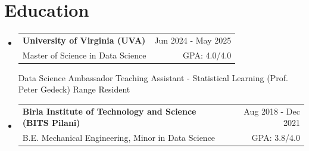 \documentclass[letterpaper,11pt]{article}
\makeatletter
\newcommand{\resumeeduSubheading}[4]{
  \item
    \begin{tabular*}{1\textwidth}{l@{\extracolsep{\fill}}r}
      \textbf{\large{#1}} & {\small{#4}} \\
      {{\small{#3}}} & {{\small{#2}}}
    \end{tabular*}
  \vspace{-0.4cm}
}
\newcommand{\resumeSubHeadingListStart}{\begin{itemize}[leftmargin=0.0in, label={}]}
\newcommand{\resumeSubHeadingListEnd}{\end{itemize}}
\makeatother
\begin{document}
\section{Education}
\resumeSubHeadingListStart
\resumeeduSubheading
    {University of Virginia {(UVA)}}
    {GPA: 4.0/4.0}
    {Master of Science in Data Science}
    {Jun 2024 - May 2025}

    \vspace{2pt}
    \footnotesize{
    Data Science Ambassador {\textbullet}
    Teaching Assistant - Statistical Learning (Prof. Peter Gedeck) {\textbullet}
    Range Resident
    }


    \vspace{5pt}
    


\resumeeduSubheading
    {Birla Institute of Technology and Science \normalsize{(BITS Pilani)}}
    {GPA: 3.8/4.0}
    {B.E. Mechanical Engineering, Minor in Data Science}
    {Aug 2018 - Dec 2021}
\resumeSubHeadingListEnd






\end{document}
